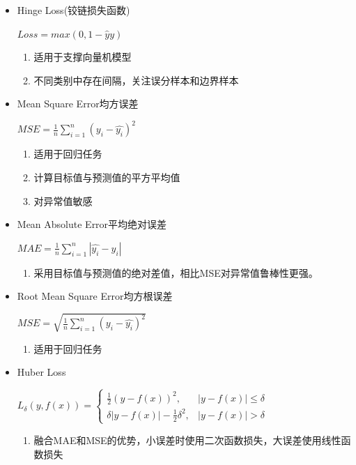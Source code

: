 \documentclass[UTF8]{ctexart}
\begin{document}
\begin{itemize}
    $Loss=\sum\limits_{i}P(x_{i})log(\frac{P(x_{i})}{Q(x_{i})})$

    \item Hinge Loss(铰链损失函数)
    
    $Loss=max(0,1-\hat{y}y)$
    \begin{enumerate}
        \item 适用于支撑向量机模型
        \item 不同类别中存在间隔，关注误分样本和边界样本
    \end{enumerate}

    \item Mean Square Error均方误差
    
    $MSE=\frac{1}{n}\sum\limits_{i=1}^{n}(y_{i}-\hat{y_{i}})^{2}$
    \begin{enumerate}
        \item 适用于回归任务
        \item 计算目标值与预测值的平方平均值
        \item 对异常值敏感
    \end{enumerate}

    \item Mean Absolute Error平均绝对误差
    
    $MAE=\frac{1}{n}\sum\limits_{i=1}^{n}|\hat{y_{i}}-y_{i}|$
    \begin{enumerate}
        \item 采用目标值与预测值的绝对差值，相比MSE对异常值鲁棒性更强。
    \end{enumerate}

    \item Root Mean Square Error均方根误差
    
    $MSE=\sqrt{\frac{1}{n}\sum\limits_{i=1}^{n}(y_{i}-\hat{y_{i}})^{2}}$
    \begin{enumerate}
        \item 适用于回归任务
    \end{enumerate} 

    \item Huber Loss
    
    $L_{\delta}(y, f(x)) = \begin{cases} \frac{1}{2}(y - f(x))^2, & |y - f(x)| \leq \delta \\ \delta|y - f(x)| - \frac{1}{2}\delta^2, & |y - f(x)| > \delta \end{cases}$
    
    \begin{enumerate}
        \item 融合MAE和MSE的优势，小误差时使用二次函数损失，大误差使用线性函数损失
    \end{enumerate}
\end{itemize}
\end{document}
